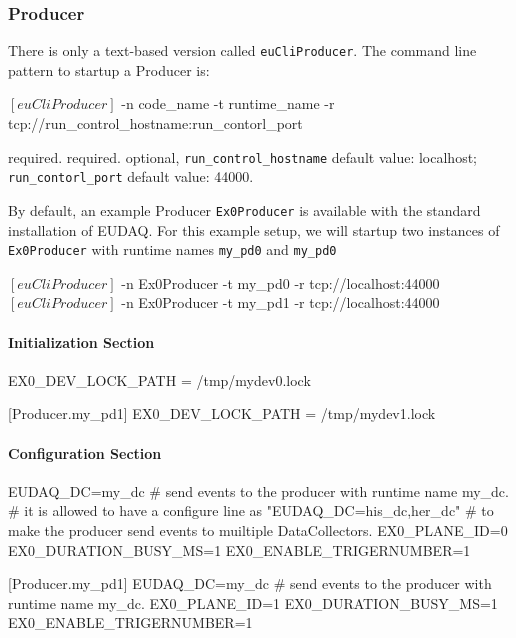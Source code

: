 \subsubsection{Producer}
\label{sec:testproducer}
There is only a text-based version called \texttt{euCliProducer}.
The command line pattern to startup a Producer is:
\begin{listing}[mybash]
$[euCliProducer]$ -n {code_name} -t {runtime_name} -r tcp://{run_control_hostname}:{run_contorl_port}
\end{listing}

\begin{description}
required.
required.
optional, \texttt{run\_control\_hostname} default value: localhost;  \texttt{run\_contorl\_port}  default value: 44000.
\end{description}

By default, an example Producer \texttt{Ex0Producer} is available with the standard installation of EUDAQ.
For this example setup, we will startup two instances of \texttt{Ex0Producer} with runtime names \texttt{my\_pd0} and \texttt{my\_pd0}\\
\begin{listing}[mybash]
$[euCliProducer]$ -n Ex0Producer -t my_pd0 -r tcp://localhost:44000
$[euCliProducer]$ -n Ex0Producer -t my_pd1 -r tcp://localhost:44000
\end{listing}

\paragraph{Initialization Section}
\begin{listing}[conf]
[Producer.my_pd0]
EX0_DEV_LOCK_PATH = /tmp/mydev0.lock

[Producer.my_pd1]
EX0_DEV_LOCK_PATH = /tmp/mydev1.lock
\end{listing}

\paragraph{Configuration Section}
\begin{listing}[conf]
[Producer.my_pd0]
EUDAQ_DC=my_dc
# send events to the producer with runtime name my_dc.
# it is allowed to have a configure line as "EUDAQ_DC=his_dc,her_dc"
# to make the producer send events to muiltiple DataCollectors.  
EX0_PLANE_ID=0
EX0_DURATION_BUSY_MS=1
EX0_ENABLE_TRIGERNUMBER=1

[Producer.my_pd1]
EUDAQ_DC=my_dc
# send events to the producer with runtime name my_dc.
EX0_PLANE_ID=1
EX0_DURATION_BUSY_MS=1
EX0_ENABLE_TRIGERNUMBER=1
\end{listing}

